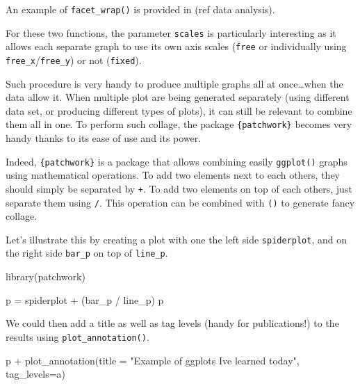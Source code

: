 \documentclass[
]{book}
\newenvironment{Shaded}{\begin{snugshade}}{\end{snugshade}}
\newcommand{\AttributeTok}[1]{\textcolor[rgb]{0.77,0.63,0.00}{#1}}
\newcommand{\FunctionTok}[1]{\textcolor[rgb]{0.00,0.00,0.00}{#1}}
\newcommand{\NormalTok}[1]{#1}
\newcommand{\OtherTok}[1]{\textcolor[rgb]{0.56,0.35,0.01}{#1}}
\newcommand{\SpecialCharTok}[1]{\textcolor[rgb]{0.00,0.00,0.00}{#1}}
\newcommand{\StringTok}[1]{\textcolor[rgb]{0.31,0.60,0.02}{#1}}
\begin{document}
An example of \texttt{facet\_wrap()} is provided in (ref data analysis).

For these two functions, the parameter \texttt{scales} is particularly interesting as it allows each separate graph to use its own axis scales (\texttt{free} or individually using \texttt{free\_x}/\texttt{free\_y}) or not (\texttt{fixed}).

Such procedure is very handy to produce multiple graphs all at once\ldots when the data allow it.
When multiple plot are being generated separately (using different data set, or producing different types of plots), it can still be relevant to combine them all in one. To perform such collage, the package \texttt{\{patchwork\}} becomes very handy thanks to its ease of use and its power.

Indeed, \texttt{\{patchwork\}} is a package that allows combining easily \texttt{ggplot()} graphs using mathematical operations.
To add two elements next to each others, they should simply be separated by \texttt{+}. To add two elements on top of each others, just separate them using \texttt{/}. This operation can be combined with \texttt{()} to generate fancy collage.

Let's illustrate this by creating a plot with one the left side \texttt{spiderplot}, and on the right side \texttt{bar\_p} on top of \texttt{line\_p}.

\begin{Shaded}
\begin{Highlighting}[]
\FunctionTok{library}\NormalTok{(patchwork)}

\NormalTok{p }\OtherTok{=}\NormalTok{ spiderplot }\SpecialCharTok{+}\NormalTok{ (bar\_p }\SpecialCharTok{/}\NormalTok{ line\_p)}
\NormalTok{p}
\end{Highlighting}
\end{Shaded}

We could then add a title as well as tag levels (handy for publications!) to the results using \texttt{plot\_annotation()}.

\begin{Shaded}
\begin{Highlighting}[]
\NormalTok{p }\SpecialCharTok{+} \FunctionTok{plot\_annotation}\NormalTok{(}\AttributeTok{title =} \StringTok{"Example of \textquotesingle{}ggplots\textquotesingle{} I\textquotesingle{}ve learned today"}\NormalTok{, }\AttributeTok{tag\_levels=}\StringTok{\textquotesingle{}a\textquotesingle{}}\NormalTok{)}
\end{Highlighting}
\end{Shaded}
\end{document}

